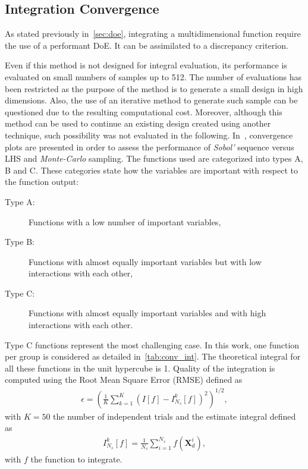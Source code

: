 \subsection{Integration Convergence}

As stated previously in~\cref{sec:doe}, integrating a multidimensional function require the use of a performant DoE. It can be assimilated to a discrepancy criterion.

Even if this method is not designed for integral evaluation, its performance is evaluated on small numbers of samples up to 512. The number of evaluations has been restricted as the purpose of the method is to generate a small design in high dimensions. Also, the use of an iterative method to generate such sample can be questioned due to the resulting computational cost. Moreover, although this method can be used to continue an existing design created using another technique, such possibility was not evaluated in the following. In~\citep{Kucherenko2015}, convergence plots are presented in order to assess the performance of \emph{Sobol'} sequence versus LHS and \emph{Monte-Carlo} sampling. The functions used are categorized into types A, B and C. These categories state how the variables are important with respect to the function output:
\begin{description}
\item[Type A:] Functions with a low number of important variables,
\item[Type B:] Functions with almost equally important variables but with low interactions with each other,
\item[Type C:] Functions with almost equally important variables and with high interactions with each other.
\end{description}
Type C functions represent the most challenging case. In this work, one function per group is considered as detailed in~\cref{tab:conv_int}. The theoretical integral for all these functions in the unit hypercube is 1. Quality of the integration is computed using the Root Mean Square Error (RMSE) defined as
\begin{align}
\epsilon = \left( \frac{1}{K} \displaystyle \sum_{k=1}^{K} \left(I[f] - I_{N_s}^k [f]\right)^2 \right)^{1/2},
\end{align}
\noindent with $K=50$ the number of independent trials and the estimate integral defined as
\begin{align}
I_{N_s}^k [f] = \frac{1}{N_s} \sum_{i=1}^{N_s} f(\mathbf{X}^{i}_d),
\end{align}
\noindent with $f$ the function to integrate. %

